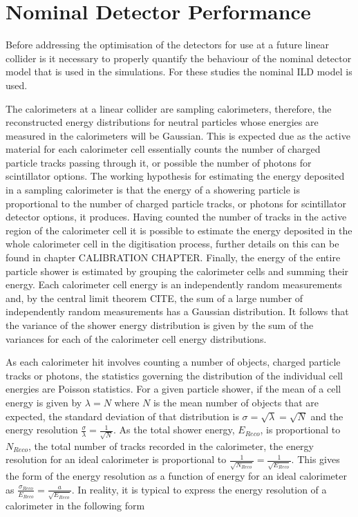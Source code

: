 \section{Nominal Detector Performance}
Before addressing the optimisation of the detectors for use at a future linear collider is it necessary to properly quantify the behaviour of the nominal detector model that is used in the simulations.  For these studies the nominal ILD model is used.  

The calorimeters at a linear collider are sampling calorimeters, therefore, the reconstructed energy distributions for neutral particles whose energies are measured in the calorimeters will be Gaussian.  This is expected due as the active material for each calorimeter cell essentially counts the number of charged particle tracks passing through it, or possible the number of photons for scintillator options.  The working hypothesis for estimating the energy deposited in a sampling calorimeter is that the energy of a showering particle is proportional to the number of charged particle tracks, or photons for scintillator detector options, it produces.  Having counted the number of tracks in the active region of the calorimeter cell it is possible to estimate the energy deposited in the whole calorimeter cell in the digitisation process, further details on this can be found in chapter CALIBRATION CHAPTER.  Finally, the energy of the entire particle shower is estimated by grouping the calorimeter cells and summing their energy.  Each calorimeter cell energy is an independently random measurements and, by the central limit theorem CITE, the sum of a large number of independently random measurements has a Gaussian distribution.  It follows that the variance of the shower energy distribution is given by the sum of the variances for each of the calorimeter cell energy distributions.  

As each calorimeter hit involves counting a number of objects, charged particle tracks or photons, the statistics governing the distribution of the individual cell energies are Poisson statistics.  For a given particle shower, if the mean of a cell energy is given by $\lambda = N$ where $N$ is the mean number of objects that are expected, the standard deviation of that distribution is $\sigma = \sqrt{\lambda} = \sqrt{N}$ and the energy resolution $\frac{\sigma}{\lambda} = \frac{1}{\sqrt{N}}$.  As the total shower energy, $E_{Reco}$, is proportional to $N_{Reco}$, the total number of tracks recorded in the calorimeter, the energy resolution for an ideal calorimeter is proportional to $\frac{1}{\sqrt{N_{Reco}}} = \frac{1}{\sqrt{E_{Reco}}}$.  This gives the form of the energy resolution as a function of energy for an ideal calorimeter as $\frac{\sigma_{Reco}}{E_{Reco}} = \frac{a}{\sqrt{E_{Reco}}}$.  In reality, it is typical to express the energy resolution of a calorimeter in the following form


